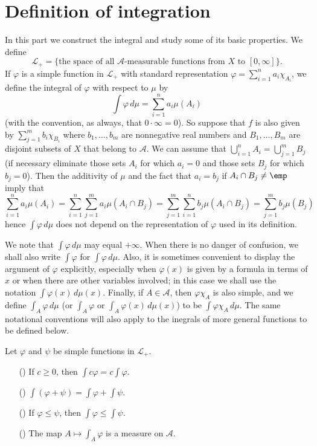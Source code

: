 \section{Definition of integration}
In this part we construct the integral and study some of its basic properties. We define
\[\mathcal{L}_+=\{\text{the space of all $\mathcal{A}$-measurable functions from $X$ to $[0,\infty]$}\}.\]
If $\varphi$ is a simple function in $\mathcal{L}_+$ with standard representation $\varphi=\sum_{i=1}^{n}a_i\chi_{A_i}$, we define the integral of $\varphi$ with respect to $\mu$ by
\[\int\varphi\,d\mu=\sum_{i=1}^{n}a_i\mu(A_i)\]
(with the convention, as always, that $0\cdot\infty=0$). So suppose that $f$ is also given by $\sum_{j=1}^{m}b_i\chi_{B_i}$ where $b_1,\dots,b_m$ are nonnegative real numbers and $B_1,\dots,B_m$ are disjoint subsets of $X$ that belong to $\mathcal{A}$. We can assume that $\bigcup_{i=1}^{n}A_i=\bigcup_{j=1}^{m}B_j$ (if necessary eliminate those sets $A_i$ for which $a_i=0$ and those sets $B_j$ for which $b_j=0$). Then the additivity of $\mu$ and the fact that $a_i=b_j$ if $A_i\cap B_j\neq\emp$ imply that
\[\sum_{i=1}^{n}a_i\mu(A_i)=\sum_{i=1}^{n}\sum_{j=1}^{m}a_i\mu(A_i\cap B_j)=\sum_{j=1}^{m}\sum_{i=1}^{n}b_j\mu(A_i\cap B_j)=\sum_{j=1}^{m}b_j\mu(B_j)\]
hence $\int\varphi\,d\mu$ does not depend on the representation of $\varphi$ used in its definition.\par
We note that $\int\varphi\,d\mu$ may equal $+\infty$. When there is no danger of confusion, we shall also write $\int\varphi$ for $\int\varphi\,d\mu$. Also, it is sometimes convenient to display the argument of $\varphi$ explicitly, especially when $\varphi(x)$ is given by a formula in terms of $x$ or when there are other variables involved; in this case we shall use the notation $\int\varphi(x)\,d\mu(x)$. Finally, if $A\in\mathcal{A}$, then $\varphi\chi_A$ is also simple, and we define $\int_A\varphi\,d\mu$ (or $\int_A\varphi$ or $\int_A\varphi(x)\,d\mu(x)$) to be $\int\varphi\chi_A\,d\mu$. The same notational conventions will also apply to the inegrals of more general functions to be defined below.
\begin{proposition}\label{int simple positive function prop}
Let $\varphi$ and $\psi$ be simple functions in $\mathcal{L}_+$.
\begin{itemize}
\item[(\rmnum{1})] If $c\geq 0$, then $\int c\varphi=c\int\varphi$.
\item[(\rmnum{2})] $\int(\varphi+\psi)=\int\varphi+\int\psi$.
\item[(\rmnum{3})] If $\varphi\leq\psi$, then $\int\varphi\leq\int\psi$.
\item[(\rmnum{4})] The map $A\mapsto\int_A\varphi$ is a measure on $\mathcal{A}$.
\end{itemize}
\end{proposition}

